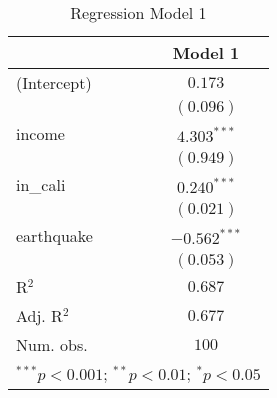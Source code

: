 
\begin{table}
\begin{center}
\begin{tabular}{l c}
\hline
 & Model 1 \\
\hline
(Intercept) & $0.173$        \\
            & $(0.096)$      \\
income      & $4.303^{***}$  \\
            & $(0.949)$      \\
in\_cali    & $0.240^{***}$  \\
            & $(0.021)$      \\
earthquake  & $-0.562^{***}$ \\
            & $(0.053)$      \\
\hline
R$^2$       & $0.687$        \\
Adj. R$^2$  & $0.677$        \\
Num. obs.   & $100$          \\
\hline
\multicolumn{2}{l}{\scriptsize{$^{***}p<0.001$; $^{**}p<0.01$; $^{*}p<0.05$}}
\end{tabular}
\caption{Regression Model 1}
\label{tab:lm_model_1}
\end{center}
\end{table}

